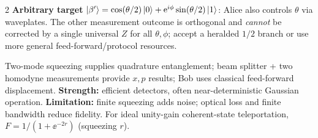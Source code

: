 \begin{multicols}{2}
\textbf{Arbitrary target} $\left\lvert \beta'\right\rangle=\cos(\theta/2)\left\lvert 0\right\rangle+\mathrm e^{i\phi}\sin(\theta/2)\left\lvert 1\right\rangle$: Alice also controls $\theta$ via waveplates. The other measurement outcome is orthogonal and \emph{cannot} be corrected by a single universal $Z$ for all $\theta,\phi$; accept a heralded $1/2$ branch or use more general feed-forward/protocol resources.

Two-mode squeezing supplies quadrature entanglement; beam splitter + two homodyne measurements provide $x,p$ results; Bob uses classical feed-forward displacement. \textbf{Strength:} efficient detectors, often near-deterministic Gaussian operation. \textbf{Limitation:} finite squeezing adds noise; optical loss and finite bandwidth reduce fidelity. For ideal unity-gain coherent-state teleportation, $F=1/(1+\ee^{-2r})$ (squeezing $r$).
\end{multicols}